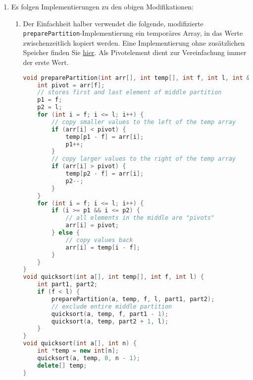 \documentclass[11pt,a4paper]{article}
\begin{document}
\begin{loesung}
\begin{enumerate}
        \item Es folgen Implementierungen zu den obigen Modifikationen:
        \begin{enumerate}[label=\roman*)]
            \item Der Einfachheit halber verwendet die folgende, modifizierte \texttt{preparePartition}-Implementierung ein temporäres Array, in das Werte zwischenzeitlich kopiert werden.
            Eine Implementierung ohne zusätzlichen Speicher finden Sie \href{https://en.wikipedia.org/wiki/Dutch_national_flag_problem}{hier}. Als Pivotelement dient zur Vereinfachung immer der erste Wert.
            \begin{lstlisting}[language=c++]
void preparePartition(int arr[], int temp[], int f, int l, int &p1, int &p2) {
    int pivot = arr[f];
    // stores first and last element of middle partition
    p1 = f;
    p2 = l;
    for (int i = f; i <= l; i++) {
        // copy smaller values to the left of the temp array
        if (arr[i] < pivot) {
            temp[p1 - f] = arr[i];
            p1++;
        }
        // copy larger values to the right of the temp array
        if (arr[i] > pivot) {
            temp[p2 - f] = arr[i];
            p2--;
        }
    }
    for (int i = f; i <= l; i++) {
        if (i >= p1 && i <= p2) {
            // all elements in the middle are "pivots"
            arr[i] = pivot;
        } else {
            // copy values back
            arr[i] = temp[i - f];
        }
    }
} 
void quicksort(int a[], int temp[], int f, int l) {
    int part1, part2;
    if (f < l) {
        preparePartition(a, temp, f, l, part1, part2);
        // exclude entire middle partition
        quicksort(a, temp, f, part1 - 1);
        quicksort(a, temp, part2 + 1, l);
    }
}
void quicksort(int a[], int n) {
    int *temp = new int[n];
    quicksort(a, temp, 0, n - 1);
    delete[] temp;
}
            \end{lstlisting}


\end{enumerate}
\end{enumerate}
\end{loesung}
\end{document}
